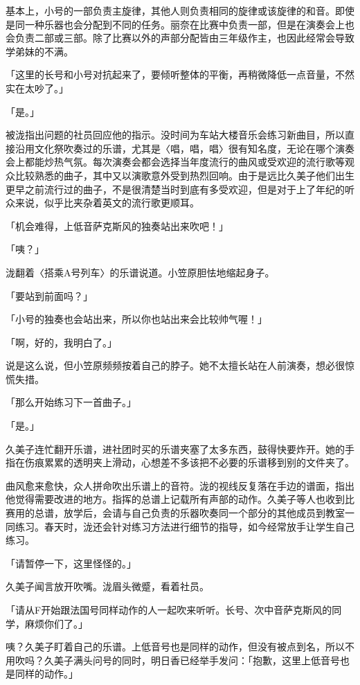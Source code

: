 \documentclass[UTF8]{ctexart}
\begin{document}
    基本上，小号的一部负责主旋律，其他人则负责相同的旋律或该旋律的和音。即使是同一种乐器也会分配到不同的任务。丽奈在比赛中负责一部，但是在演奏会上也会负责二部或三部。除了比赛以外的声部分配皆由三年级作主，也因此经常会导致学弟妹的不满。 

    「这里的长号和小号对抗起来了，要倾听整体的平衡，再稍微降低一点音量，不然实在太吵了。」 

    「是。」 

    被泷指出问题的社员回应他的指示。没时间为车站大楼音乐会练习新曲目，所以直接沿用文化祭吹奏过的乐谱，尤其是〈唱，唱，唱〉很有知名度，无论在哪个演奏会上都能炒热气氛。每次演奏会都会选择当年度流行的曲风或受欢迎的流行歌等观众比较熟悉的曲子，其中又以演歌意外受到热烈回响。由于是远比久美子他们出生更早之前流行过的曲子，不是很清楚当时到底有多受欢迎，但是对于上了年纪的听众来说，似乎比夹杂着英文的流行歌更顺耳。 

    「机会难得，上低音萨克斯风的独奏站出来吹吧！」 

    「咦？」 

    泷翻着〈搭乘A号列车〉的乐谱说道。小笠原胆怯地缩起身子。 

    「要站到前面吗？」 

    「小号的独奏也会站出来，所以你也站出来会比较帅气喔！」 

    「啊，好的，我明白了。」 

    说是这么说，但小笠原频频按着自己的脖子。她不太擅长站在人前演奏，想必很惊慌失措。 

    「那么开始练习下一首曲子。」 

    「是。」 

    久美子连忙翻开乐谱，进社团时买的乐谱夹塞了太多东西，鼓得快要炸开。她的手指在伤痕累累的透明夹上滑动，心想差不多该把不必要的乐谱移到别的文件夹了。 

    曲风愈来愈快，众人拼命吹出乐谱上的音符。泷的视线反复落在手边的谱面，指出他觉得需要改进的地方。指挥的总谱上记载所有声部的动作。久美子等人也收到比赛用的总谱，放学后，会请与自己负责的乐器吹奏同一个部分的其他成员到教室一同练习。春天时，泷还会针对练习方法进行细节的指导，如今经常放手让学生自己练习。 

    「请暂停一下，这里怪怪的。」 

    久美子闻言放开吹嘴。泷眉头微蹙，看着社员。 

    「请从F开始跟法国号同样动作的人一起吹来听听。长号、次中音萨克斯风的同学，麻烦你们了。」 

    咦？久美子盯着自己的乐谱。上低音号也是同样的动作，但没有被点到名，所以不用吹吗？久美子满头问号的同时，明日香已经举手发问：「抱歉，这里上低音号也是同样的动作。」 
\end{document}
